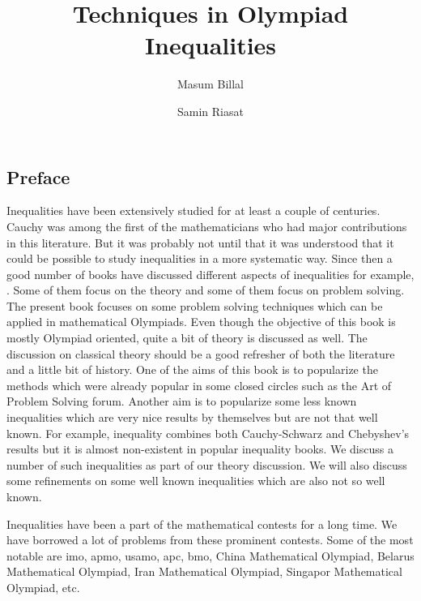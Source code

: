 \documentclass[a4paper, 12pt, leqno,]{book}
\title{\bfseries Techniques in Olympiad Inequalities}
\author{Masum Billal\and Samin Riasat}
\theoremstyle{definition}
\numberwithin{problem}{chapter}
\begin{document}
	\frontmatter
	\maketitle
	\begin{refsection}
		\section*{Preface}
		Inequalities have been extensively studied for at least a couple of centuries. Cauchy was among the first of the mathematicians who had major contributions in this literature. But it was probably not until \textcite{hardy_littlewood_poolya_2018} that it was understood that it could be possible to study inequalities in a more systematic way. Since then a good number of books have discussed different aspects of inequalities for example, \textcite{beckenbach_bellman_1983}. Some of them focus on the theory and some of them focus on problem solving. The present book focuses on some problem solving techniques which can be applied in mathematical Olympiads. Even though the objective of this book is mostly Olympiad oriented, quite a bit of theory is discussed as well. The discussion on classical theory should be a good refresher of both the literature and a little bit of history. One of the aims of this book is to popularize the methods which were already popular in some closed circles such as the Art of Problem Solving forum. Another aim is to popularize some less known inequalities which are very nice results by themselves but are not that well known. For example, \textcite{Seitz1936} inequality combines both Cauchy-Schwarz and Chebyshev's results but it is almost non-existent in popular inequality books. We discuss a number of such inequalities as part of our theory discussion. We will also discuss some refinements on some well known inequalities which are also not so well known.
		
		Inequalities have been a part of the mathematical contests for a long time. We have borrowed a lot of problems from these prominent contests. Some of the most notable are \Gls{imo}, \Gls{apmo}, \Gls{usamo}, \Gls{apc}, \Gls{bmo}, China Mathematical Olympiad, Belarus Mathematical Olympiad, Iran Mathematical Olympiad, Singapor Mathematical Olympiad, etc. 
		\printbibliography
	\end{refsection}
	\tableofcontents
	\mainmatter

	\begin{refsection}
		
		
		
		
		
		
		\printbibliography
	\end{refsection}
	
\end{document}
